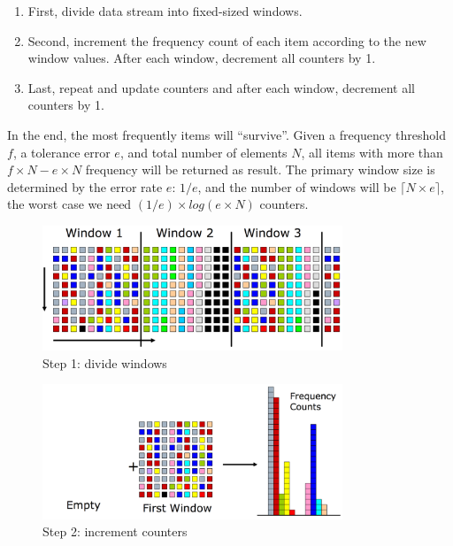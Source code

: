 \begin{enumerate}
    \item First, divide data stream into fixed-sized windows.
    \item Second, increment the frequency count of each item according to the new window values. After each window, decrement all counters by 1.
    \item Last, repeat and update counters and after each window, decrement all counters by 1.
\end{enumerate}

In the end, the most frequently items will ``survive''. Given a frequency threshold $f$, a tolerance error $e$, and total number of elements $N$, all items with more than $f\times N - e \times N$ frequency will be returned as result. The primary window size is determined by the error rate $e$: $1/e$, and the number of windows will be $\lceil N\times e \rceil$, the worst case we need $(1/e)\times log(e\times N)$ counters.

\begin{figure}[H]
    \centering
    \includegraphics[width=0.8\textwidth]{RelatedWorks/lossy1.png}
    \caption{Step 1: divide windows \cite{lossymanku}}
    \label{fig:lossy1}
\end{figure}

\begin{figure}[H]
    \centering
    \includegraphics[width=0.8\textwidth]{RelatedWorks/lossy2.png}
    \caption{Step 2: increment counters \cite{lossymanku}}
    \label{fig:lossy2}
\end{figure}

